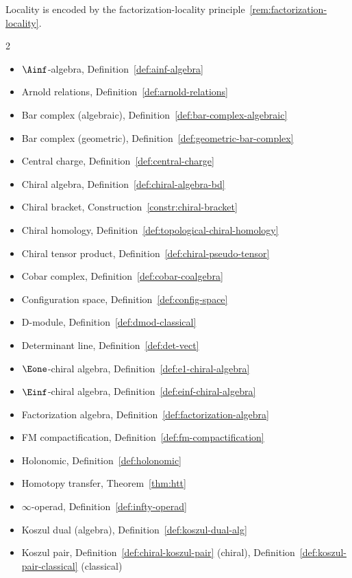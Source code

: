 \begin{definition}\label{def:locality}
Locality is encoded by the factorization-locality principle~\ref{rem:factorization-locality}.
\end{definition}

\begin{multicols}{2}
\begin{itemize}[leftmargin=*, itemsep=0pt]
\item $\Ainf$-algebra, Definition~\ref{def:ainf-algebra}
\item Arnold relations, Definition~\ref{def:arnold-relations}
\item Bar complex (algebraic), Definition~\ref{def:bar-complex-algebraic}
\item Bar complex (geometric), Definition~\ref{def:geometric-bar-complex}
\item Central charge, Definition~\ref{def:central-charge}
\item Chiral algebra, Definition~\ref{def:chiral-algebra-bd}
\item Chiral bracket, Construction~\ref{constr:chiral-bracket}
\item Chiral homology, Definition~\ref{def:topological-chiral-homology}
\item Chiral tensor product, Definition~\ref{def:chiral-pseudo-tensor}
\item Cobar complex, Definition~\ref{def:cobar-coalgebra}
\item Configuration space, Definition~\ref{def:config-space}
\item D-module, Definition~\ref{def:dmod-classical}
\item Determinant line, Definition~\ref{def:det-vect}
\item $\Eone$-chiral algebra, Definition~\ref{def:e1-chiral-algebra}
\item $\Einf$-chiral algebra, Definition~\ref{def:einf-chiral-algebra}
\item Factorization algebra, Definition~\ref{def:factorization-algebra}
\item FM compactification, Definition~\ref{def:fm-compactification}
\item Holonomic, Definition~\ref{def:holonomic}
\item Homotopy transfer, Theorem~\ref{thm:htt}
\item $\infty$-operad, Definition~\ref{def:infty-operad}
\item Koszul dual (algebra), Definition~\ref{def:koszul-dual-alg}
\item Koszul pair, Definition~\ref{def:chiral-koszul-pair} (chiral), Definition~\ref{def:koszul-pair-classical} (classical)

\end{itemize}
\end{multicols}
